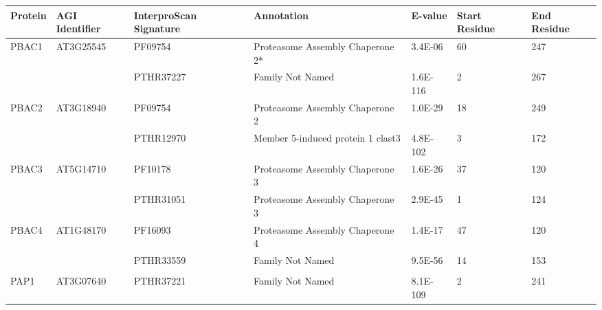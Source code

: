 \begin{tabular}{@{}lllllll@{}}
\toprule
Protein & AGI Identifier & InterproScan Signature & Annotation                        & E-value  & Start Residue & End Residue \\ \midrule
PBAC1   & AT3G25545      & PF09754                & Proteasome Assembly Chaperone 2*  & 3.4E-06  & 60            & 247         \\
        &                & PTHR37227              & Family Not Named                  & 1.6E-116 & 2             & 267         \\
PBAC2   & AT3G18940      & PF09754                & Proteasome Assembly Chaperone 2   & 1.0E-29  & 18            & 249         \\
        &                & PTHR12970              & Member 5-induced protein 1 clast3 & 4.8E-102 & 3             & 172         \\
PBAC3   & AT5G14710      & PF10178                & Proteasome Assembly Chaperone 3   & 1.6E-26  & 37            & 120         \\
        &                & PTHR31051              & Proteasome Assembly Chaperone 3   & 2.9E-45  & 1             & 124         \\
PBAC4   & AT1G48170      & PF16093                & Proteasome Assembly Chaperone 4   & 1.4E-17  & 47            & 120         \\
        &                & PTHR33559              & Family Not Named                  & 9.5E-56  & 14            & 153         \\
        &                &                        &                                   &          &               &             \\
PAP1    & AT3G07640      & PTHR37221              & Family Not Named                  & 8.1E-109 & 2             & 241         \\ \bottomrule
\end{tabular}